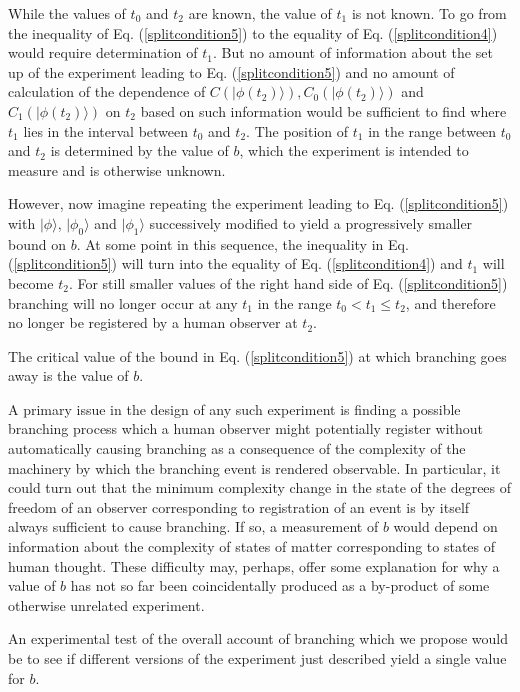 \documentclass[twocolumn,amsmath,amssymb]{revtex4-1}
\begin{document}
While the values of $t_0$ and $t_2$ are known, the
value of $t_1$ is not known.
To go from the inequality of Eq. (\ref{splitcondition5})
to the equality of Eq. (\ref{splitcondition4}) would
require determination of $t_1$.
But no amount of information about the set up of
the experiment leading to Eq. (\ref{splitcondition5})
and no amount of calculation of the dependence of
$C( |\phi(t_2) \rangle ), C_0( |\phi(t_2) \rangle )$ and $C_1( |\phi(t_2) \rangle )$
on $t_2$
based on
such information would be sufficient to find where
$t_1$ lies in the interval between $t_0$ and $t_2$.
The position of $t_1$ in the
range between $t_0$ and $t_2$ is determined by
the value of $b$, which the experiment
is intended to measure and is otherwise unknown.

However, now imagine repeating the experiment leading
to Eq. (\ref{splitcondition5}) with
$|\phi \rangle $, $|\phi_0 \rangle $ and $|\phi_1 \rangle $ successively
modified to yield a progressively smaller
bound on $b$.
At some point in this
sequence, the inequality
in Eq. (\ref{splitcondition5})
will turn into the equality of
Eq. (\ref{splitcondition4})
and $t_1$ will become $t_2$.
For still smaller values
of the right hand side of Eq. (\ref{splitcondition5})
branching will no longer occur
at any $t_1$ in the range
$t_0 < t_1 \le t_2$, and therefore
no longer be registered by a human observer at $t_2$.

The critical
value of the bound in Eq. (\ref{splitcondition5})
at which branching goes away is the
value of $b$.


A primary issue in the design of any such
experiment is finding a possible branching process which a human
observer might potentially register without
automatically causing branching
as a consequence of the complexity of the machinery
by which the branching event is rendered observable.
In particular, it could turn out that
the minimum complexity change in the state
of the degrees of freedom of an observer
corresponding to registration of an event
is by itself always sufficient
to cause branching.
If so, a measurement of $b$
would depend on information
about the complexity
of states of matter
corresponding to states of human thought.
These difficulty may, perhaps,
offer some explanation for why a value
of $b$ has not so far been coincidentally
produced as a by-product of some otherwise
unrelated experiment.

An experimental test of the overall account of branching
which we propose would be to see if
different versions of the experiment
just described yield a single
value for $b$.
\end{document}
